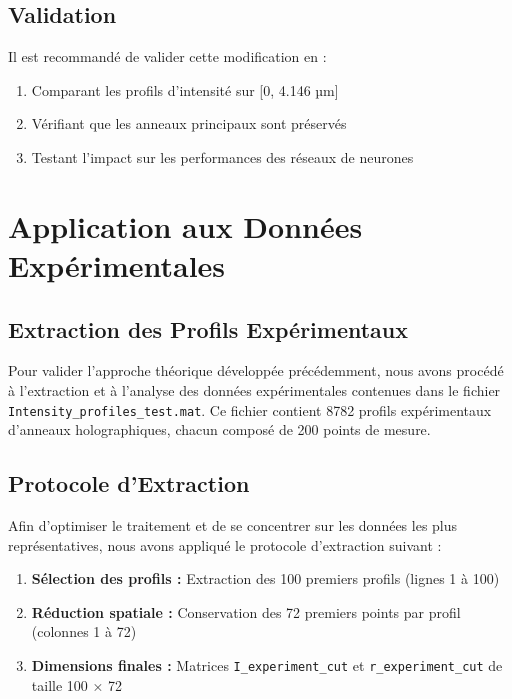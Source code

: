 \documentclass[twocolumn,10pt]{article}
\begin{document}
\subsection{Validation}

Il est recommandé de valider cette modification en :

\begin{enumerate}
\item Comparant les profils d'intensité sur [0, 4.146 µm]
\item Vérifiant que les anneaux principaux sont préservés
\item Testant l'impact sur les performances des réseaux de neurones
\end{enumerate}

\section{Application aux Données Expérimentales}

\subsection{Extraction des Profils Expérimentaux}

Pour valider l'approche théorique développée précédemment, nous avons procédé à l'extraction et à l'analyse des données expérimentales contenues dans le fichier \texttt{Intensity\_profiles\_test.mat}. Ce fichier contient 8782 profils expérimentaux d'anneaux holographiques, chacun composé de 200 points de mesure.

\subsection{Protocole d'Extraction}

Afin d'optimiser le traitement et de se concentrer sur les données les plus représentatives, nous avons appliqué le protocole d'extraction suivant :

\begin{enumerate}
\item \textbf{Sélection des profils :} Extraction des 100 premiers profils (lignes 1 à 100)
\item \textbf{Réduction spatiale :} Conservation des 72 premiers points par profil (colonnes 1 à 72)
\item \textbf{Dimensions finales :} Matrices \texttt{I\_experiment\_cut} et \texttt{r\_experiment\_cut} de taille 100 × 72
\end{enumerate}
\end{document}
